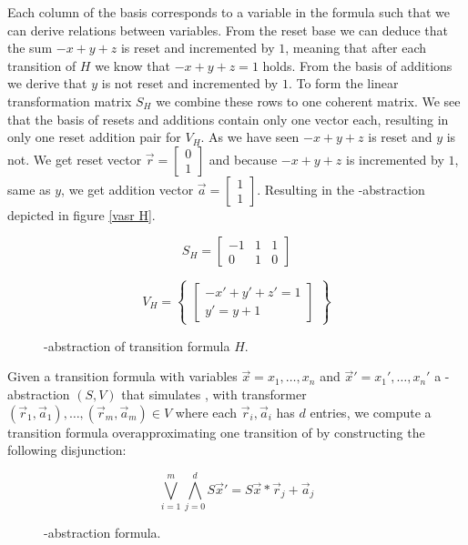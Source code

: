 Each column of the basis corresponds to a variable in the formula such that we can derive relations between variables. From the reset base we can deduce that the sum $-x + y + z$ is reset and incremented by $1$, meaning that after each transition of $H$ we know that $-x + y + z = 1$ holds. From the basis of additions we derive that $y$ is not reset and incremented by $1$. To form the linear transformation matrix $S_H$ we combine these rows to one coherent matrix. We see that the basis of resets and additions contain only one vector each, resulting in only one reset addition pair for $V_H$. As we have seen $-x + y + z$ is reset and $y$ is not. We get reset vector $\vec{r} = \begin{bmatrix} 0 \\ 1 \end{bmatrix}$ and because $-x + y + z$ is incremented by $1$, same as $y$, we get addition vector $\vec{a} = \begin{bmatrix} 1 \\ 1 \end{bmatrix}$. Resulting in the \qvasr-abstraction depicted in figure \ref{vasr  H}.
\vspace*{-2em}
\begin{figure}[H]
	\begin{center}
		\begin{minipage}{0.3\linewidth}
			\begin{equation*}
				S_H = \begin{bmatrix} -1 & 1 & 1 \\ 0 & 1 & 0 \end{bmatrix}
			\end{equation*}
		\end{minipage}
		\begin{minipage}{0.6\linewidth}
			\begin{equation*}
				V_H = \begin{Bmatrix} \begin{bmatrix} -x' + y' + z' = 1\\ y' = y + 1 \end{bmatrix} \end{Bmatrix}
			\end{equation*}
		\end{minipage}
		\caption{\qvasr-abstraction of transition formula $H$.}
		\label{vasr H}
	\end{center}
\end{figure}
\vspace*{-2em}
Given a transition formula \trf with variables $\vec{x} = x_1, \ldots, x_n$ and $\vec{x}' = x_1', \ldots, x_n'$ a \qvasr-abstraction $(S, V)$ that simulates \trf, with transformer $(\vec{r}_1, \vec{a}_1), \ldots, (\vec{r}_m, \vec{a}_m) \in V$ where each $\vec{r}_i, \vec{a}_i$ has $d$ entries, we compute a transition formula overapproximating one transition of \trf by constructing the following disjunction:
\begin{figure}[H]
	\begin{equation*}
		\bigvee\limits_{i=1}^m \bigwedge\limits_{j=0}^d S\vec{x}' = S\vec{x} * \vec{r}_j + \vec{a}_j
	\end{equation*}
	\label{vasrTrans}
	\caption{\qvasr-abstraction formula.}
\end{figure}


